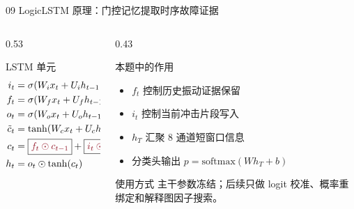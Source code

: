 \documentclass[aspectratio=169]{beamer}
\newcommand{\tightitems}{\setlength{\itemsep}{0.32em}}
\begin{document}
\begin{frame}{09 LogicLSTM 原理：门控记忆提取时序故障证据}
    \small
    \begin{columns}[T,onlytextwidth]
        \begin{column}{0.53\textwidth}
            \begin{block}{LSTM 单元}
                \[
                \begin{aligned}
                i_t &= \sigma(W_i x_t + U_i h_{t-1}+b_i)\\
                f_t &= \sigma(W_f x_t + U_f h_{t-1}+b_f)\\
                o_t &= \sigma(W_o x_t + U_o h_{t-1}+b_o)\\
                \tilde c_t &= \tanh(W_c x_t + U_c h_{t-1}+b_c)\\
                c_t &= \boxed{\color{rucRed}{f_t \odot c_{t-1}}}
                      + \boxed{\color{rucRed}{i_t \odot \tilde c_t}}\\
                h_t &= o_t \odot \tanh(c_t)
                \end{aligned}
                \]
            \end{block}
        \end{column}
        \begin{column}{0.43\textwidth}
            \begin{block}{本题中的作用}
                \begin{itemize}
                    \tightitems
                    \item $f_t$ 控制历史振动证据保留
                    \item $i_t$ 控制当前冲击片段写入
                    \item $h_T$ 汇聚 8 通道短窗口信息
                    \item 分类头输出 $p=\mathrm{softmax}(W h_T+b)$
                \end{itemize}
            \end{block}
            \begin{block}{使用方式}
                主干参数冻结；后续只做 logit 校准、概率重绑定和解释图因子搜索。
            \end{block}
        \end{column}
    \end{columns}
\end{frame}
\end{document}
